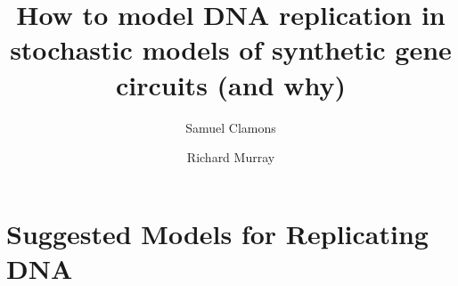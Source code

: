 \documentclass[preprint,12pt]{oldplainarticle}
\title{How to model DNA replication in stochastic models of synthetic gene circuits (and why)}
\author[1]{Samuel Clamons}
\author[1]{Richard Murray}
\affil[1]{Caltech, Pasadena, CA, United States}
\begin{document}
\maketitle
\thispagestyle{empty}









%
%
%

\tableofcontents


\pagebreak
\section{Suggested Models for Replicating DNA}
\end{document}
